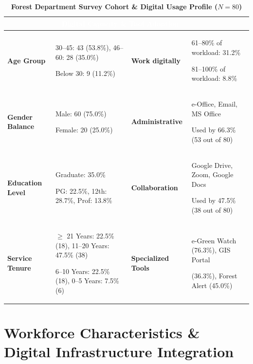 \documentclass[10pt,a4paper]{article}
\begin{document}
\vspace{0.05cm}

\renewcommand{\arraystretch}{1.05}
\begin{table}[h!]
\centering
\footnotesize
\caption{\textbf{Forest Department Survey Cohort \& Digital Usage Profile ($N=80$)}}
\vspace{0.05cm}
\begin{tabularx}{\textwidth}{>{\columncolor{lightgray}}l X >{\columncolor{lightgray}}l X}
\toprule
\rowcolor{navyblue}
\multicolumn{2}{c}{\textcolor{white}{\textbf{Workforce Profile \& Demographics}}} & \multicolumn{2}{c}{\textcolor{white}{\textbf{Digital Capacity \& Tool Adoption}}} \\
\midrule
\textbf{Age Group}       & 30--45: 43 (53.8\%), 46--60: 28 (35.0\%) \par Below 30: 9 (11.2\%) & \textbf{Work digitally} & 61--80\% of workload: 31.2\% \par 81--100\% of workload: 8.8\% \\
\rowcolor{white}
\textbf{Gender Balance}  & Male: 60 (75.0\%) \par Female: 20 (25.0\%) & \textbf{Administrative} & e-Office, Email, MS Office \par Used by 66.3\% (53 out of 80) \\
\textbf{Education Level} & Graduate: 35.0\% \par PG: 22.5\%, 12th: 28.7\%, Prof: 13.8\% & \textbf{Collaboration}  & Google Drive, Zoom, Google Docs \par Used by 47.5\% (38 out of 80) \\
\rowcolor{white}
\textbf{Service Tenure}  & $\ge$ 21 Years: 22.5\% (18), 11--20 Years: 47.5\% (38) \par 6--10 Years: 22.5\% (18), 0--5 Years: 7.5\% (6) & \textbf{Specialized Tools} & e-Green Watch (76.3\%), GIS Portal \par (36.3\%), Forest Alert (45.0\%) \\
\bottomrule
\end{tabularx}
\end{table}

\vspace{-0.25cm}

\section{Workforce Characteristics \& Digital Infrastructure Integration}
\end{document}

